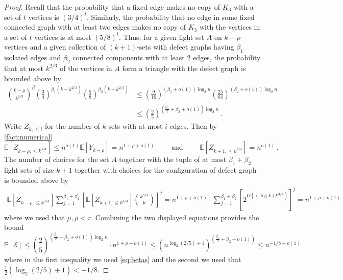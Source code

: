 \documentclass[11pt]{article}
\theoremstyle{definition}
\theoremstyle{remark}
\newcommand{\E}{\mathbb{E}}
\newcommand{\PP}{\mathbb{P}}
\newcommand{\cE}{\mathcal{E}}
\begin{document}
\begin{proof}
Recall that the probability that a fixed edge makes no copy of $K_3$ with a set of $t$ vertices is $ (3/4)^t$. Similarly, the probability that no edge in some fixed connected graph with at least two edges makes no copy of $K_3$ with the vertices in a set of $t$ vertices is at most $ (5/8)^t$.
Thus, for a given light set $A$ on $k - \rho$ vertices and a given collection of $(k+1)$-sets with defect graphs having $\beta_1$ isolated edges and $\beta_2$  connected components with at least $2$ edges, the probability that at most $k^{2/3}$ of the vertices in $A$ form a triangle with the defect graph is bounded above by 
\begin{align*}
    \binom{k-\rho}{k^{2/3}}^\beta \left( \frac{3}{4}  \right)^{\beta_1(k - k^{2/3})} \left( \frac{5}{8} \right)^{\beta_2(k - k^{2/3})} &\leq \left(\frac{9}{16} \right)^{(\beta_1 + o(1))\log_2 n}\left(\frac{25}{64} \right)^{(\beta_2 + o(1))\log_2 n} \\
    &\leq \left(\frac{2}{5} \right)^{(\frac{\beta_1}{2} + \beta_2 + o(1)) \log_2 n}\,.
\end{align*}
Write $Z_{k,\le i}$ for the number of $k$-sets with at most $i$ edges. Then by \cref{fact:numerical} 
$$ \E[Z_{k - \rho, \leq k^{3/4}}] \leq n^{o(1)} \E[Y_{k - \rho}] = n^{1 + \rho + o(1)}\qquad \text{ and } \qquad \E[ Z_{k+1, \leq k^{3/4}}] = n^{o(1)}\,.$$ The number of choices for the set $A$ together with the tuple of at most $\beta_1 + \beta_2$ light sets of size $k+1$ together with choices for the configuration of defect graph is bounded above by \begin{align*}
    \E[Z_{k - \rho, \leq k^{3/4}}] \sum_{j = 1}^{\beta_1 + \beta_2}\left[ \E[Z_{k+1,\leq k^{3/4}}]\binom{k^{3/4}}{\mu} \right]^j = n^{1 + \rho + o(1)} \cdot \sum_{j = 1}^{\beta_1 + \beta_2}\left[ 2^{O( (\log k)k^{3/4})} \right]^j = n^{1 + \rho + o(1)}
\end{align*}
where we used that $\mu,\rho < r$.
Combining the two displayed equations provides the bound \begin{equation*}
    \PP[\cE] \leq \left(\frac{2}{5} \right)^{(\frac{\beta_1}{2} + \beta_2 + o(1)) \log_2 n} \cdot n^{1 + \rho + o(1)} \leq \left(n^{\log_2 (2/5) + 1} \right)^{(\frac{\beta_1}{2} + \beta_2 + o(1))} \leq n^{-1/8 + o(1)}
\end{equation*}
where in the first inequality we used \eqref{eq:betas} and the second we used that $\frac{1}{2}(\log_2 (2/5) + 1) < -1/8.$
\end{proof}
\end{document}
